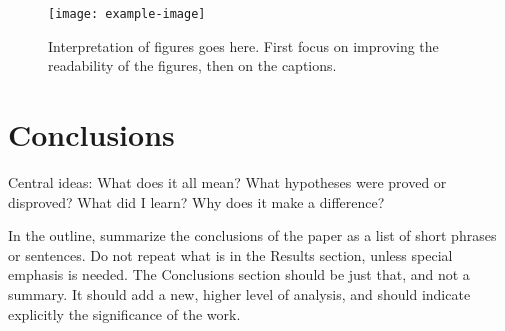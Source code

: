 \documentclass[twoside,twocolumn,9pt]{article}
\renewcommand{\refname}{Notes and references}
\begin{document}
\begin{center}
    \begin{figure}
        \texttt{[image: example-image]}
        \caption{Interpretation of figures goes here. First focus on improving the readability of the figures, then on the captions.}
        \label{fig:my_label}
    \end{figure}
\end{center}

\section{Conclusions}

Central ideas: What does it all mean? What hypotheses were proved or disproved? What did I learn? Why does it make a difference?

In the outline, summarize the conclusions of the paper as a list of short phrases or sentences. Do not repeat what is in the Results section, unless special emphasis is needed. The Conclusions section should be just that, and not a summary. It should add a new, higher level of analysis, and should indicate explicitly the significance of the work.



\balance


\end{document}
